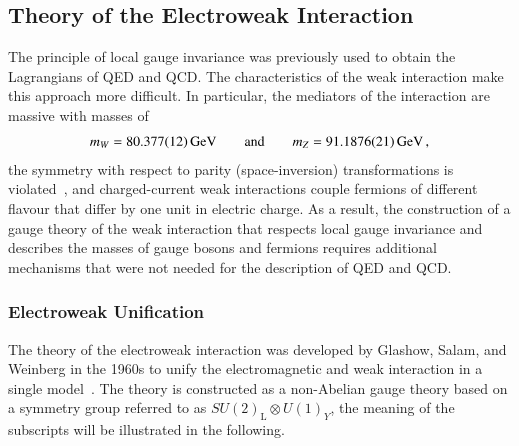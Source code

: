 \subsection{Theory of the Electroweak Interaction}%
\label{seq:theory_ewk}

The principle of local gauge invariance was previously used to obtain the
Lagrangians of QED and QCD. The characteristics of the weak interaction make
this approach more difficult. In particular, the mediators of the interaction
are massive with masses of~\cite{pdg2020}
\begin{align*}
  m_W = \SI{80.377 +- 0.012}{\ensuremath{\text{GeV}}}
  \qquad \text{and} \qquad
  m_{Z} = \SI{91.1876 +- 0.0021}{\ensuremath{\text{GeV}}} \,\text{,}
\end{align*}
the symmetry with respect to parity (space-inversion) transformations is
violated~\cite{Wu:1957my}, and charged-current weak interactions couple fermions
of different flavour that differ by one unit in electric charge. As a result,
the construction of a gauge theory of the weak interaction that respects local
gauge invariance and describes the masses of gauge bosons and fermions requires
additional mechanisms that were not needed for the description of QED and QCD.


\subsubsection{Electroweak Unification}

The theory of the electroweak interaction was developed by Glashow, Salam, and
Weinberg in the 1960s to unify the electromagnetic and weak interaction in a
single model~\cite{Glashow:1961tr,Salam:1964ry,Weinberg:1967tq}. The theory is
constructed as a non-Abelian gauge theory based on a symmetry group referred to
as $SU(2)_{\text{L}} \otimes U(1)_{Y}$, the meaning of the subscripts will be
illustrated in the following.

